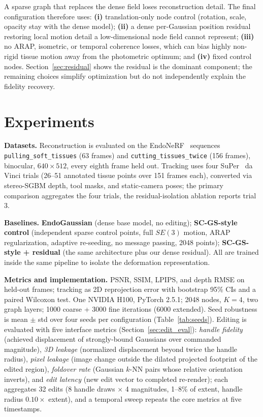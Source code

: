 \documentclass[AMA,Times1COL]{WileyNJDv5} %
\begin{document}
A sparse graph that replaces the dense field loses reconstruction detail. The final configuration therefore uses: \textbf{(i)} translation-only node control (rotation, scale, opacity stay with the dense model); \textbf{(ii)} a dense per-Gaussian position residual restoring local motion detail a low-dimensional node field cannot represent; \textbf{(iii)} no ARAP, isometric, or temporal coherence losses, which can bias highly non-rigid tissue motion away from the photometric optimum; and \textbf{(iv)} fixed control nodes. Section~\ref{sec:residual} shows the residual is the dominant component; the remaining choices simplify optimization but do not independently explain the fidelity recovery.

\section{Experiments}\label{sec4}

\textbf{Datasets.} Reconstruction is evaluated on the EndoNeRF~\cite{wang2022endonerf} sequences \texttt{pulling\_soft\_tissues} (63 frames) and \texttt{cutting\_tissues\_twice} (156 frames), binocular, $640\times512$, every eighth frame held out. Tracking uses four SuPer~\cite{li2020super} da Vinci trials (26--51 annotated tissue points over 151 frames each), converted via stereo-SGBM depth, tool masks, and static-camera poses; the primary comparison aggregates the four trials, the residual-isolation ablation reports trial 3.

\textbf{Baselines.} \textbf{EndoGaussian} (dense base model, no editing); \textbf{SC-GS-style control} (independent sparse control points, full $SE(3)$ motion, ARAP regularization, adaptive re-seeding, no message passing, 2048 points); \textbf{SC-GS-style + residual} (the same architecture plus our dense residual). All are trained inside the same pipeline to isolate the deformation representation.

\textbf{Metrics and implementation.} PSNR, SSIM, LPIPS, and depth RMSE on held-out frames; tracking as 2D reprojection error with bootstrap 95\% CIs and a paired Wilcoxon test. One NVIDIA H100, PyTorch 2.5.1; 2048 nodes, $K=4$, two graph layers; 1000 coarse + 3000 fine iterations (6000 extended). Seed robustness is mean $\pm$ std over four seeds per configuration (Table~\ref{tab:seeds}). Editing is evaluated with five interface metrics (Section~\ref{sec:edit_eval}): \emph{handle fidelity} (achieved displacement of strongly-bound Gaussians over commanded magnitude), \emph{3D leakage} (normalized displacement beyond twice the handle radius), \emph{pixel leakage} (image change outside the dilated projected footprint of the edited region), \emph{foldover rate} (Gaussian $k$-NN pairs whose relative orientation inverts), and \emph{edit latency} (new edit vector to completed re-render); each aggregates 32 edits (8 handle draws $\times$ 4 magnitudes, 1--8\% of extent, handle radius $0.10\times$ extent), and a temporal sweep repeats the core metrics at five timestamps.
\end{document}
